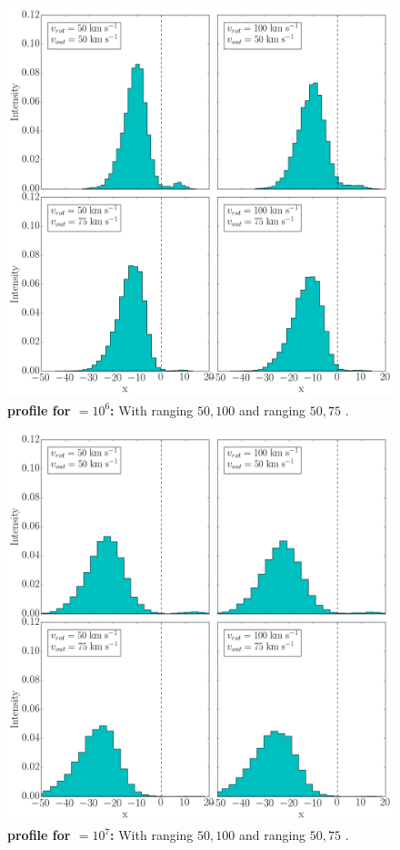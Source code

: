 \begin{figure}[h!]
	\begin{center}
		\includegraphics[width=1\textwidth]{./figures/appendix/2_tau10E6_phi83-90}
	\end{center}
	\caption{\textbf{\lya profile for \tauh$=10^6$:} With \vrot ranging $50,100$ \kms and \vout ranging $50,75$ \kms.
		\label{fig:2_tau10E6_phi83-90}}
\end{figure}

\begin{figure}[h!]
	\begin{center}
		\includegraphics[width=1\textwidth]{./figures/appendix/2_tau10E7_phi83-90}
	\end{center}
	\caption{\textbf{\lya profile for \tauh$=10^7$:} With \vrot ranging $50,100$ \kms and \vout ranging $50,75$ \kms.
		\label{fig:2_tau10E7_phi83-90}}
\end{figure}